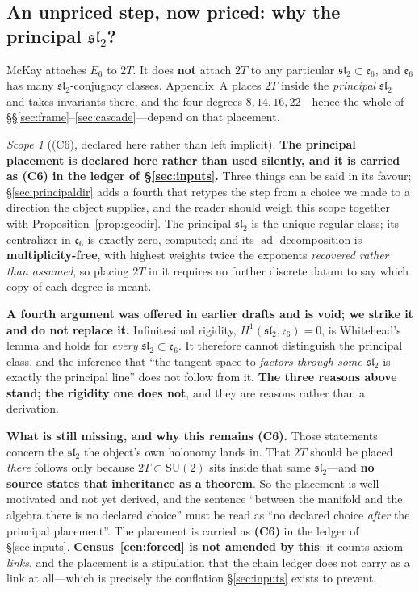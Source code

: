 \documentclass[11pt,reqno]{amsart}
\theoremstyle{plain}
\theoremstyle{definition}
\theoremstyle{remark}
\newtheorem{scope}[theorem]{Scope}
\newcommand{\SU}{\mathrm{SU}}
\newcommand{\sll}{\mathfrak{sl}}
\newcommand{\ee}{\mathfrak{e}}
\newcommand{\ad}{\operatorname{ad}}
\begin{document}
\subsection{An unpriced step, now priced: why the principal $\sll_2$?}\label{sec:principal}

McKay attaches $E_6$ to $2T$. It does \textbf{not} attach $2T$ to any particular
$\sll_2\subset\ee_6$, and $\ee_6$ has many $\sll_2$-conjugacy classes. Appendix~A places
$2T$ inside the \emph{principal} $\sll_2$ and takes invariants there, and the four
degrees $8,14,16,22$---hence the whole of \S\S\ref{sec:frame}--\ref{sec:cascade}---depend
on that placement.

\begin{scope}[(C6), declared here rather than left implicit]\label{sc:principal}
\textbf{The principal placement is declared here rather than used silently, and it is
carried as (C6) in the ledger of \S\ref{sec:inputs}.} Three things can be said in its
favour; \S\ref{sec:principaldir} adds a fourth that retypes the step from a choice we
made to a direction the object supplies, and the reader should weigh this scope together
with Proposition~\ref{prop:geodir}.
The principal $\sll_2$ is the unique regular class; its centralizer in $\ee_6$ is exactly
zero, computed; and its $\ad$-decomposition is \textbf{multiplicity-free}, with highest
weights twice the exponents \emph{recovered rather than assumed}, so placing $2T$ in it
requires no further discrete datum to say which copy of each degree is meant.

\textbf{A fourth argument was offered in earlier drafts and is void; we strike it and do
not replace it.} Infinitesimal rigidity, $H^1(\sll_2,\ee_6)=0$, is Whitehead's lemma and
holds for \emph{every} $\sll_2\subset\ee_6$. It therefore cannot distinguish the
principal class, and the inference that ``the tangent space to \emph{factors through some
$\sll_2$} is exactly the principal line'' does not follow from it. \textbf{The three
reasons above stand; the rigidity one does not}, and they are reasons rather than a
derivation.

\textbf{What is still missing, and why this remains (C6).} Those statements concern the
$\sll_2$ the object's own holonomy lands in. That $2T$ should be placed \emph{there}
follows only because $2T\subset\SU(2)$ sits inside that same $\sll_2$---and \textbf{no
source states that inheritance as a theorem}. So the placement is well-motivated and not
yet derived, and the sentence ``between the manifold and the algebra there is no declared
choice'' must be read as ``no declared choice \emph{after} the principal placement''.
The placement is carried as \textbf{(C6)} in the ledger of \S\ref{sec:inputs}.
\textbf{Census~\ref{cen:forced} is not amended by this}: it counts axiom \emph{links},
and the placement is a stipulation that the chain ledger does not carry as a link at
all---which is precisely the conflation \S\ref{sec:inputs} exists to prevent.
\end{scope}
\end{document}
